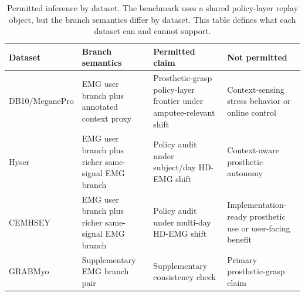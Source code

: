\begin{table}[!t]
\centering
\caption{Permitted inference by dataset. The benchmark uses a shared policy-layer replay object, but the branch semantics differ by dataset. This table defines what each dataset can and cannot support.}
\label{tab:dataset-inference-boundary}
\footnotesize
\setlength{\tabcolsep}{4pt}
\begin{tabular}{p{}p{}p{}p{}}
\toprule
Dataset & Branch semantics & Permitted claim & Not permitted \\
\midrule
DB10/MeganePro & EMG user branch plus annotated context proxy & Prosthetic-grasp policy-layer frontier under amputee-relevant shift & Context-sensing stress behavior or online control \\
Hyser & EMG user branch plus richer same-signal EMG branch & Policy audit under subject/day HD-EMG shift & Context-aware prosthetic autonomy \\
CEMHSEY & EMG user branch plus richer same-signal EMG branch & Policy audit under multi-day HD-EMG shift & Implementation-ready prosthetic use or user-facing benefit \\
GRABMyo & Supplementary EMG branch pair & Supplementary consistency check & Primary prosthetic-grasp claim \\
\bottomrule
\end{tabular}
\end{table}
